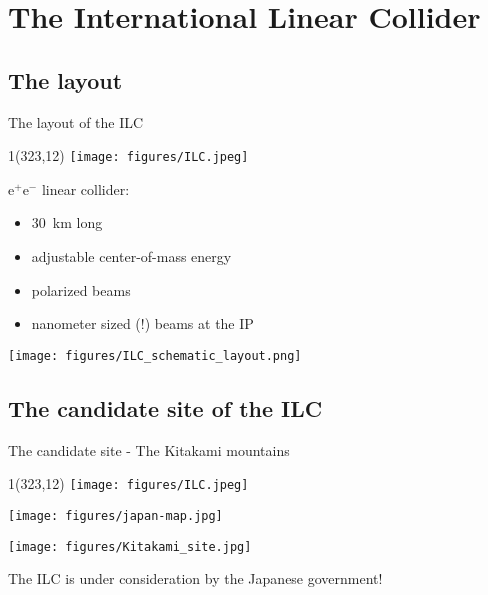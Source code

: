 \documentclass[xcolor={dvipsnames}]{beamer}
\newcommand{\ilclogo}{
  \setlength{\TPHorizModule}{1pt}
  \setlength{\TPVertModule}{1pt}
  \begin{textblock}{1}(323,12)
   \texttt{[image: figures/ILC.jpeg]}
  \end{textblock}
}
\begin{document}

\section{The International Linear Collider}
\subsection{The layout}
\begin{frame}{The layout of the ILC}
\ilclogo
e$^+$e$^-$ linear collider:
\begin{itemize}
 \item \SI{30}{\kilo\metre} long
 \item adjustable center-of-mass energy
 \item polarized beams
 \item nanometer sized (!) beams at the IP
\end{itemize}
\begin{center}
\texttt{[image: figures/ILC\_schematic\_layout.png]}
\end{center}
\end{frame}

\subsection{The candidate site of the ILC}

\begin{frame}{The candidate site - The Kitakami mountains}
\ilclogo
\begin{center}
\begin{minipage}[t]{0.49\textwidth}
\centering
 \texttt{[image: figures/japan-map.jpg]}
\end{minipage}
\begin{minipage}[t]{0.48\textwidth}
\centering
   \texttt{[image: figures/Kitakami\_site.jpg]}
\end{minipage}
\begin{block}{}
 The ILC is under consideration by the Japanese government!
\end{block}

\end{center}
\end{frame}
\end{document}
